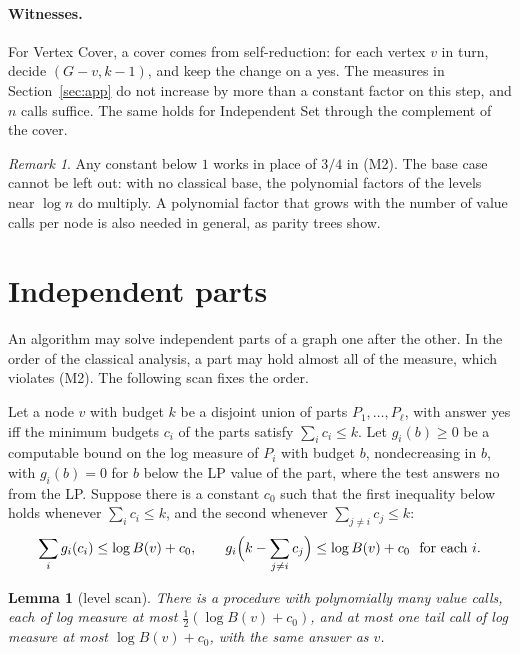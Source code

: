 \documentclass[11pt]{article}
\newtheorem{lemma}[theorem]{Lemma}
\theoremstyle{definition}
\theoremstyle{remark}
\newtheorem{remark}[theorem]{Remark}
\begin{document}
\paragraph{Witnesses.} For Vertex Cover, a cover comes from self-reduction: for each vertex $v$ in turn, decide $(G-v,k-1)$, and keep the change on a yes. The measures in Section~\ref{sec:app} do not increase by more than a constant factor on this step, and $n$ calls suffice. The same holds for Independent Set through the complement of the cover.

\begin{remark}
Any constant below $1$ works in place of $3/4$ in (M2). The base case cannot be left out: with no classical base, the polynomial factors of the levels near $\log n$ do multiply. A polynomial factor that grows with the number of value calls per node is also needed in general, as parity trees show.
\end{remark}

\section{Independent parts}\label{sec:scan}

An algorithm may solve independent parts of a graph one after the other. In the order of the classical analysis, a part may hold almost all of the measure, which violates (M2). The following scan fixes the order.

Let a node $v$ with budget $k$ be a disjoint union of parts $P_1,\dots,P_\ell$, with answer yes iff the minimum budgets $c_i$ of the parts satisfy $\sum_ic_i\le k$. Let $g_i(b)\ge0$ be a computable bound on the log measure of $P_i$ with budget $b$, nondecreasing in $b$, with $g_i(b)=0$ for $b$ below the LP value of the part, where the test answers no from the LP. Suppose there is a constant $c_0$ such that the first inequality below holds whenever $\sum_ic_i\le k$, and the second whenever $\sum_{j\ne i}c_j\le k$:
\begin{equation}\label{eq:add}
\sum_ig_i(c_i)\le\log B(v)+c_0,\qquad g_i\Bigl(k-\sum_{j\ne i}c_j\Bigr)\le\log B(v)+c_0\ \text{ for each }i.
\end{equation}

\begin{lemma}[level scan]\label{lem:scan}
There is a procedure with polynomially many value calls, each of log measure at most $\frac12(\log B(v)+c_0)$, and at most one tail call of log measure at most $\log B(v)+c_0$, with the same answer as $v$.
\end{lemma}
\end{document}
